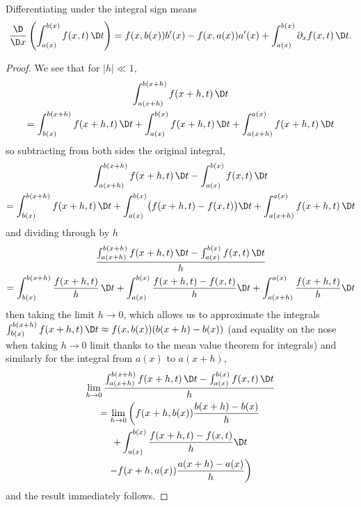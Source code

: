 \begin{node}\label{calculus:integral-000G}%
Differentiating under the integral sign means
\begin{equation*}
\frac{\D}{\D x}\left(\int^{b(x)}_{a(x)}f(x,t)\,\D t\right)
=f(x,b(x))b'(x) - f(x,a(x))a'(x)+\int^{b(x)}_{a(x)}\partial_{x}f(x,t)\,\D t.
\end{equation*}
\begin{proof}
We see that for $|h|\ll1$,
\begin{multline}
\int^{b(x+h)}_{a(x+h)}f(x+h,t)\,\D t\\
=\int^{b(x+h)}_{b(x)}f(x+h,t)\,\D t
+\int^{b(x)}_{a(x)}f(x+h,t)\,\D t
+\int^{a(x)}_{a(x+h)}f(x+h,t)\,\D t
\end{multline}
so subtracting from both sides the original integral,
\begin{multline}
\int^{b(x+h)}_{a(x+h)}f(x+h,t)\,\D t-\int^{b(x)}_{a(x)}f(x,t)\,\D t\\
=\int^{b(x+h)}_{b(x)}f(x+h,t)\,\D t
+\int^{b(x)}_{a(x)}\bigl(f(x+h,t)-f(x,t)\bigr)\D t
+\int^{a(x)}_{a(x+h)}f(x+h,t)\,\D t
\end{multline}
and dividing through by $h$
\begin{multline}
\frac{\int^{b(x+h)}_{a(x+h)}f(x+h,t)\,\D t-\int^{b(x)}_{a(x)}f(x,t)\,\D t}{h}\\
=\int^{b(x+h)}_{b(x)}\frac{f(x+h,t)}{h}\,\D t
+\int^{b(x)}_{a(x)}\frac{f(x+h,t)-f(x,t)}{h}\D t
+\int^{a(x)}_{a(x+h)}\frac{f(x+h,t)}{h}\D t
\end{multline}
then taking the limit $h\to 0$, which allows us to approximate the
integrals $\int^{b(x+h)}_{b(x)}f(x+h,t)\,\D t\approx f(x,b(x))(b(x+h)-b(x))$
(and equality on the nose when taking $h\to0$ limit thanks to the mean
value theorem for integrals)
and similarly for the integral from $a(x)$ to $a(x+h)$,
\begin{multline}
\lim_{h\to0}\frac{\int^{b(x+h)}_{a(x+h)}f(x+h,t)\,\D t-\int^{b(x)}_{a(x)}f(x,t)\,\D t}{h}\\
=\lim_{h\to0}\left(f(x+h,b(x))\frac{b(x+h)-b(x)}{h}\right.\\
+\int^{b(x)}_{a(x)}\frac{f(x+h,t)-f(x,t)}{h}\D t\\
\left.-f(x+h,a(x))\frac{a(x+h)-a(x)}{h}\right)
\end{multline}
and the result immediately follows.
\end{proof}
\end{node}
